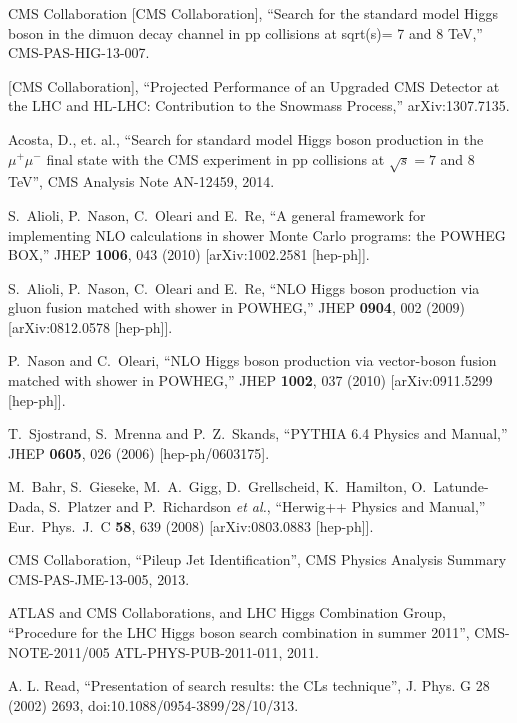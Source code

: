 \documentclass[12pt]{article}
\begin{document}
\begin{thebibliography}{9}

  CMS Collaboration [CMS Collaboration],
  ``Search for the standard model Higgs boson in the dimuon decay channel in pp collisions at sqrt(s)= 7 and 8 TeV,''
  CMS-PAS-HIG-13-007.

  [CMS Collaboration],
  ``Projected Performance of an Upgraded CMS Detector at the LHC and HL-LHC: Contribution to the Snowmass Process,''
  arXiv:1307.7135.


  Acosta, D., et. al.,
  ``Search for standard model Higgs boson production in the $\mu^+\mu^-$ final state with the CMS experiment in pp collisions at $\sqrt{s}=7$ and 8\, TeV'',
  CMS Analysis Note AN-12459,
  2014.

  S.~Alioli, P.~Nason, C.~Oleari and E.~Re,
  ``A general framework for implementing NLO calculations in shower Monte Carlo programs: the POWHEG BOX,''
  JHEP {\bf 1006}, 043 (2010)
  [arXiv:1002.2581 [hep-ph]].

  S.~Alioli, P.~Nason, C.~Oleari and E.~Re,
  ``NLO Higgs boson production via gluon fusion matched with shower in POWHEG,''
  JHEP {\bf 0904}, 002 (2009)
  [arXiv:0812.0578 [hep-ph]].

  P.~Nason and C.~Oleari,
  ``NLO Higgs boson production via vector-boson fusion matched with shower in POWHEG,''
  JHEP {\bf 1002}, 037 (2010)
  [arXiv:0911.5299 [hep-ph]].

  T.~Sjostrand, S.~Mrenna and P.~Z.~Skands,
  ``PYTHIA 6.4 Physics and Manual,''
  JHEP {\bf 0605}, 026 (2006)
  [hep-ph/0603175].

  M.~Bahr, S.~Gieseke, M.~A.~Gigg, D.~Grellscheid, K.~Hamilton, O.~Latunde-Dada, S.~Platzer and P.~Richardson {\it et al.},
  ``Herwig++ Physics and Manual,''
  Eur.\ Phys.\ J.\ C {\bf 58}, 639 (2008)
  [arXiv:0803.0883 [hep-ph]].

  CMS Collaboration, ``Pileup Jet Identification'', 
  CMS Physics Analysis Summary CMS-PAS-JME-13-005, 
  2013.

  ATLAS and CMS Collaborations, and LHC Higgs Combination Group, ``Procedure for
  the LHC Higgs boson search combination in summer 2011'', 
  CMS-NOTE-2011/005 ATL-PHYS-PUB-2011-011, 2011.

  A. L. Read, ``Presentation of search results: the CLs technique'', J. Phys. G 28 (2002) 2693,
  doi:10.1088/0954-3899/28/10/313.

\end{thebibliography}
\end{document}
